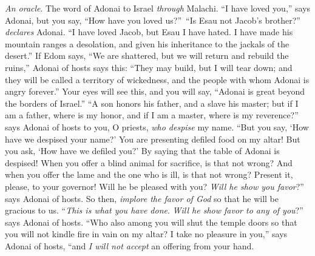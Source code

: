 
\begin{biblechapter} %
\verse \textit{An oracle}. The word of Adonai to Israel \textit{through} Malachi.
 “I have loved you,” says Adonai, but you say, “How have you loved us?” “Is Esau not Jacob’s brother?” \textit{declares} Adonai. “I have loved Jacob,
\verse but Esau I have hated. I have made his mountain ranges a desolation, and given his inheritance to the jackals of the desert.”
\verse If Edom says, “We are shattered, but we will return and rebuild the ruins,” Adonai of hosts says this: “They may build, but I will tear down; and they will be called a territory of wickedness, and the people with whom Adonai is angry forever.”
\verse Your eyes will see this, and you will say, “Adonai is great beyond the borders of Israel.”
 “A son honors his father, and a slave his master; but if I am a father, where is my honor, and if I am a master, where is my reverence?” says Adonai of hosts to you, O priests, \textit{who despise} my name. “But you say, ‘How have we despised your name?’
\verse You are presenting defiled food on my altar! But you ask, ‘How have we defiled you?’ By saying that the table of Adonai is despised!
\verse When you offer a blind animal for sacrifice, is that not wrong? And when you offer the lame and the one who is ill, is that not wrong? Present it, please, to your governor! Will he be pleased with you? \textit{Will he show you favor}?” says Adonai of hosts.
\verse So then, \textit{implore the favor of God} so that he will be gracious to us. “\textit{This is what you have done}. \textit{Will he show favor to any of you}?” says Adonai of hosts.
\verse “Who also among you will shut the temple doors so that you will not kindle fire in vain on my altar? I take no pleasure in you,” says Adonai of hosts, “and \textit{I will not accept} an offering from your hand.

\end{biblechapter}
